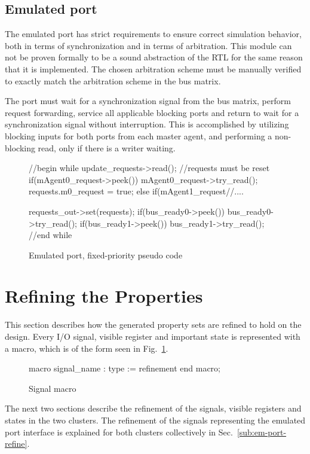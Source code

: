 \subsection{Emulated port}
\label{sub:portem}
The emulated port has strict requirements to ensure correct simulation behavior, both in terms of synchronization and in terms of arbitration. This module can not be proven formally to be a sound abstraction of the RTL for the same reason that it is implemented. The chosen arbitration scheme must be manually verified to exactly match the arbitration scheme in the bus matrix. \par 
The port must wait for a synchronization signal from the bus matrix, perform request forwarding, service all applicable blocking ports and return to wait for a synchronization signal without interruption. This is accomplished by utilizing blocking inputs for both ports from each master agent, and performing a non-blocking read, only if there is a writer waiting. 
\begin{figure}[h!]
\begin{C++}
//begin while
update_requests->read(); 
//requests must be reset 
if(mAgent0_request->peek()){
mAgent0_request->try_read();
requests.m0_request = true;
}else if(mAgent1_request//....

requests_out->set(requests); 
if(bus_ready0->peek()) bus_ready0->try_read();
if(bus_ready1->peek()) bus_ready1->try_read();
//end while
\end{C++}
\caption{Emulated port, fixed-priority pseudo code}
\end{figure}

\section{Refining the Properties}
\label{sec:refine}
This section describes how the generated property sets are refined to hold on the design. Every I/O signal, visible register and important state is represented with a macro, which is of the form seen in Fig.~\ref{fig:macro}.
\begin{figure}[h!]
\begin{VHI}
macro signal_name : type := refinement end macro;
\end{VHI}
\caption{Signal macro}
\label{fig:macro}
\end{figure}

The next two sections describe the refinement of the signals, visible registers and states in the two clusters. The refinement of the signals representing the emulated port interface is explained for both clusters collectively in Sec.~\ref{sub:em-port-refine}.

